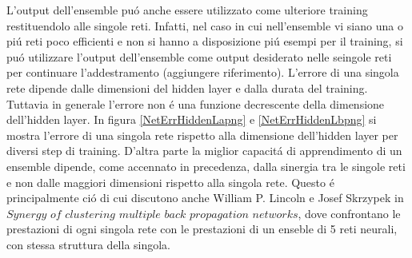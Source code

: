 \documentclass[a4paper,10pt]{article}
\begin{document}
 L'output dell'ensemble pu\'o anche essere utilizzato come ulteriore training restituendolo alle singole reti. Infatti, nel caso in cui nell'ensemble vi siano una o pi\'u reti poco efficienti e non si hanno a disposizione pi\'u esempi per il training, si pu\'o utilizzare l'output dell'ensemble come output desiderato nelle seingole reti per continuare l'addestramento (aggiungere riferimento). 
 L'errore di una singola rete dipende dalle dimensioni del hidden layer e dalla durata del training. Tuttavia in generale l'errore non \'e una funzione decrescente della dimensione dell'hidden layer. In figura \ref{NetErrHiddenLapng} e \ref{NetErrHiddenLbpng} si mostra l'errore di una singola rete rispetto alla dimensione dell'hidden layer per diversi step di training. D'altra parte la miglior capacit\'a di apprendimento di un ensemble dipende, come accennato in precedenza, dalla sinergia tra le singole reti e non dalle maggiori dimensioni rispetto alla singola rete. Questo \'e principalmente ci\'o di cui discutono anche William P. Lincoln e Josef Skrzypek in $Synergy$ $of$ $clustering$ $multiple$ $back$ $propagation$ $networks$, dove confrontano le prestazioni di ogni singola rete con le prestazioni di un enseble di 5 reti neurali, con stessa struttura della singola.
 
\end{document}
